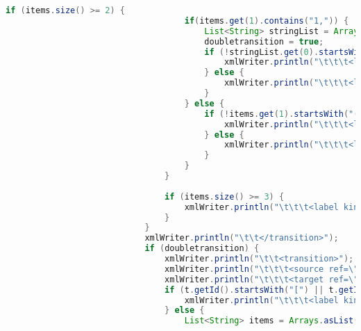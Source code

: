 \begin{lstlisting}[language=java, caption={példa unit teszteset.},captionpos=b]
								if (items.size() >= 2) {
									if(items.get(1).contains("1,")) {
										List<String> stringList = Arrays.asList(items.get(1).split("\\s*\\|\\|\\s*"));
										doubletransition = true;
										if (!stringList.get(0).startsWith("(")) {
											xmlWriter.println("\t\t\t<label kind=\"guard\" x=\"" + t.getSender().getId().substring(1) + ".5\" y=\"" + t.getSender().getId().substring(1) + ".5\">" + stringList.get(0).replaceAll("&", "&amp;&amp;").replaceAll("<", "&lt;").replaceAll(">", "&gt;").replaceAll("\\(", "").replaceAll("\\)", "").replaceAll(",", " and") + "</label>");
										} else {
											xmlWriter.println("\t\t\t<label kind=\"guard\" x=\"" + t.getSender().getId().substring(1) + ".5\" y=\"" + t.getSender().getId().substring(1) + ".5\">" + stringList.get(0).replaceAll("&", "&amp;&amp;").replaceAll("<", "&lt;").replaceAll(">", "&gt;").replaceAll(",", " and") + "</label>");
										}
									} else {
										if (!items.get(1).startsWith("(")) {
											xmlWriter.println("\t\t\t<label kind=\"guard\" x=\"" + t.getSender().getId().substring(1) + ".5\" y=\"" + t.getSender().getId().substring(1) + ".5\">" + items.get(1).replaceAll("&", "&amp;&amp;").replaceAll("<", "&lt;").replaceAll(">", "&gt;").replaceAll("\\(", "").replaceAll("\\)", "").replaceAll(",", " and") + "</label>");
										} else {
											xmlWriter.println("\t\t\t<label kind=\"guard\" x=\"" + t.getSender().getId().substring(1) + ".5\" y=\"" + t.getSender().getId().substring(1) + ".5\">" + items.get(1).replaceAll("&", "&amp;&amp;").replaceAll("<", "&lt;").replaceAll(">", "&gt;").replaceAll(",", " and") + "</label>");
										}
									}
								}
		
								if (items.size() >= 3) {
									xmlWriter.println("\t\t\t<label kind=\"assignment\" x=\"" + t.getSender().getId().substring(1) + ".5\" y=\"" + t.getSender().getId().substring(1) + ".5\">" + items.get(2).replaceAll("&", "&amp;") + "</label>");
								}
							}
							xmlWriter.println("\t\t</transition>");
							if (doubletransition) {
								xmlWriter.println("\t\t<transition>");
								xmlWriter.println("\t\t\t<source ref=\"" + t.getSender().getId() + "\"/>");
								xmlWriter.println("\t\t\t<target ref=\"" + t.getReceiver().getId() + "\"/>");
								if (t.getId().startsWith("[") || t.getId().startsWith("![")) {
									xmlWriter.println("\t\t\t<label kind=\"guard\" x=\"" + t.getSender().getId().substring(1) + ".5\" y=\"" + t.getSender().getId().substring(1) + ".5\">" + t.getId().substring(0, t.getId().indexOf("]")).replaceAll("<", "&lt;").replaceAll(">", "&gt;").replace("[", "") + "</label>");
								} else {
									List<String> items = Arrays.asList(t.getId().split("\\s*;\\s*"));
			

\end{lstlisting}
